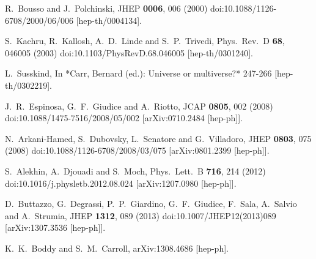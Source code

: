 \documentclass[12pt,letterpaper]{article}
\begin{document}
\begin{thebibliography}{999}
  R.~Bousso and J.~Polchinski,
  JHEP {\bf 0006}, 006 (2000)
  doi:10.1088/1126-6708/2000/06/006
  [hep-th/0004134].

  S.~Kachru, R.~Kallosh, A.~D.~Linde and S.~P.~Trivedi,
  Phys.\ Rev.\ D {\bf 68}, 046005 (2003)
  doi:10.1103/PhysRevD.68.046005
  [hep-th/0301240].
  
  L.~Susskind,
  In *Carr, Bernard (ed.): Universe or multiverse?* 247-266
  [hep-th/0302219].

  J.~R.~Espinosa, G.~F.~Giudice and A.~Riotto,
  JCAP {\bf 0805}, 002 (2008)
  doi:10.1088/1475-7516/2008/05/002
  [arXiv:0710.2484 [hep-ph]].

  N.~Arkani-Hamed, S.~Dubovsky, L.~Senatore and G.~Villadoro,
  JHEP {\bf 0803}, 075 (2008)
  doi:10.1088/1126-6708/2008/03/075
  [arXiv:0801.2399 [hep-ph]].

  S.~Alekhin, A.~Djouadi and S.~Moch,
  Phys.\ Lett.\ B {\bf 716}, 214 (2012)
  doi:10.1016/j.physletb.2012.08.024
  [arXiv:1207.0980 [hep-ph]].
  
  D.~Buttazzo, G.~Degrassi, P.~P.~Giardino, G.~F.~Giudice, F.~Sala, A.~Salvio and A.~Strumia,
  JHEP {\bf 1312}, 089 (2013)
  doi:10.1007/JHEP12(2013)089
  [arXiv:1307.3536 [hep-ph]].

  K.~K.~Boddy and S.~M.~Carroll,
  arXiv:1308.4686 [hep-ph].
  

\end{thebibliography}
\end{document}
